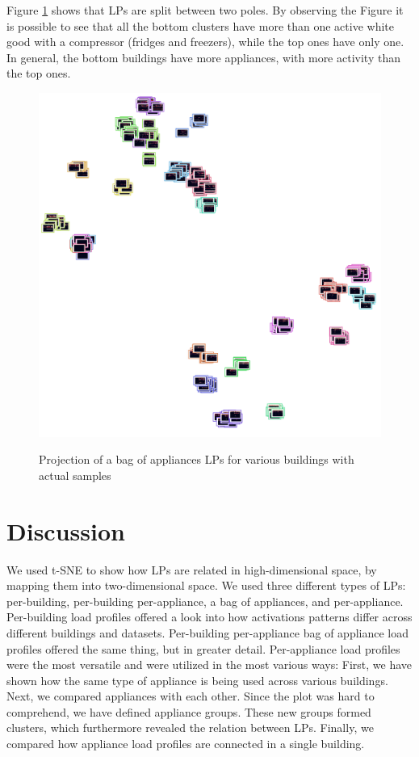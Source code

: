 Figure \ref{fig:tsne_boa_img_scatter_refit8} shows that LPs are split 
between two poles. 
By observing the Figure it is possible to see that all the bottom clusters
have more than one active white good with a compressor (fridges and freezers), while
the top ones have only one. In general, the bottom buildings have more appliances,
with more activity than the top ones. 

\begin{figure}[H]
	\centering
	\caption{Projection of a bag of appliances LPs for various buildings with actual samples}
	\includegraphics[width=.9\textwidth]{Figures/TSNE/TSNE_BOA/img_scatter_boa.png}
	\label{fig:tsne_boa_img_scatter_refit8}
\end{figure}

\section{Discussion}

We used t-SNE to show how LPs are related in high-dimensional space, by mapping them into two-dimensional space.
We used three different types of LPs: per-building, per-building per-appliance, a bag of appliances, and per-appliance.
Per-building load profiles offered a look into how activations patterns differ across different buildings and datasets.
Per-building per-appliance bag of appliance load profiles offered the same thing, but in greater detail.
Per-appliance load profiles were the most versatile and were utilized in the most various ways:
First, we have shown how the same type of appliance is being used across various buildings.
Next, we compared appliances with each other. 
Since the plot was hard to comprehend, we have defined appliance groups.
These new groups formed clusters, which furthermore revealed the relation between LPs. 
Finally, we compared how appliance load profiles are connected in a single building. 

